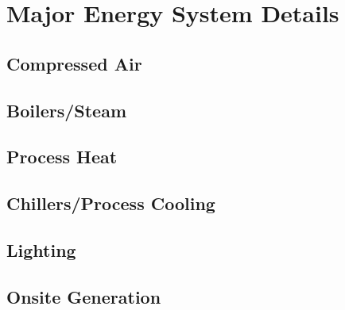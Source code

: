 \section{Major Energy System Details}
\label{sec:Major-Systems-App}

\subsection*{Compressed Air}

\subsection*{Boilers/Steam}

\subsection*{Process Heat}

\subsection*{Chillers/Process Cooling}

\subsection*{Lighting}

\subsection*{Onsite Generation}

